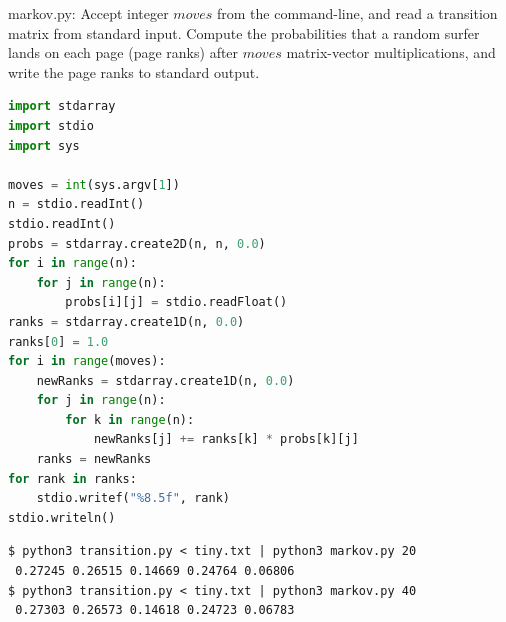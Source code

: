 \documentclass[8pt,a4paper,compress]{beamer}
\begin{document}
\begin{frame}[fragile]
\pause

\begin{framed}
\tiny markov.py: Accept integer $moves$ from the command-line, and read a transition matrix from standard input. Compute the probabilities that a
random surfer lands on each page (page ranks) after $moves$ matrix-vector multiplications, and write the page ranks to standard output.
\end{framed}

\begin{lstlisting}[language=Python]
import stdarray
import stdio
import sys

moves = int(sys.argv[1])
n = stdio.readInt()
stdio.readInt()
probs = stdarray.create2D(n, n, 0.0)
for i in range(n):
    for j in range(n):
        probs[i][j] = stdio.readFloat()
ranks = stdarray.create1D(n, 0.0)
ranks[0] = 1.0
for i in range(moves):
    newRanks = stdarray.create1D(n, 0.0)
    for j in range(n):
        for k in range(n):
            newRanks[j] += ranks[k] * probs[k][j]
    ranks = newRanks
for rank in ranks:
    stdio.writef("%8.5f", rank)
stdio.writeln()
\end{lstlisting}

\pause

\begin{lstlisting}[language={}]
$ python3 transition.py < tiny.txt | python3 markov.py 20
 0.27245 0.26515 0.14669 0.24764 0.06806
$ python3 transition.py < tiny.txt | python3 markov.py 40
 0.27303 0.26573 0.14618 0.24723 0.06783
\end{lstlisting}
\end{frame}
\end{document}
